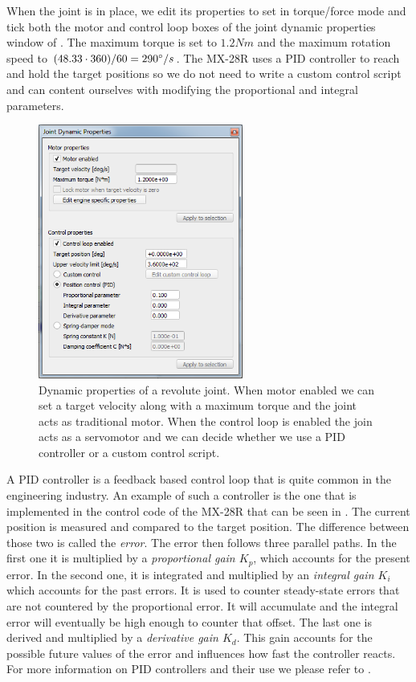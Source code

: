 When the joint is in place, we edit its properties to set in torque/force mode and tick both the motor and control loop boxes of the joint dynamic properties window of . The maximum torque is set to $1.2Nm$ and the maximum rotation speed to $(48.33 \cdot 360) / 60 = 290 \degree/s$. The MX-28R uses a PID controller to reach and hold the target positions so we do not need to write a custom control script and can content ourselves with modifying the proportional and integral parameters. 

\begin{figure}[htp]
\centering
    \includegraphics[width = 0.6\textwidth]{figures/joint}
    \caption[Dynamic properties of a revolute joint]{Dynamic properties of a revolute joint. When motor enabled we can set a target velocity along with a maximum torque and the joint acts as traditional motor. When the control loop is enabled the join acts as a servomotor and we can decide whether we use a PID controller or a custom control script.}
    \label{fig:joint}
\end{figure}

A PID controller is a feedback based control loop that is quite common in the engineering industry. An example of such a controller is the one that is implemented in the control code of the MX-28R that can be seen in . The current position is measured and compared to the target position. The difference between those two is called the \emph{error}. The error then follows three parallel paths. In the first one it is multiplied by a \emph{proportional gain $K_p$}, which accounts for the present error. In the second one, it is integrated and multiplied by an \emph{integral gain $K_i$} which accounts for the past errors. It is used to counter steady-state errors that are not countered by the proportional error. It will accumulate and the integral error will eventually be high enough to counter that offset. The last one is derived and multiplied by a \emph{derivative gain $K_d$}. This gain accounts for the possible future values of the error and influences how fast the controller reacts. For more information on PID controllers and their use we please refer to \cite{johnson2005pid}.

